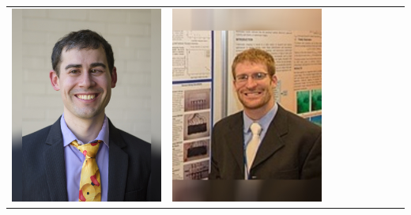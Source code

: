 \documentclass[landscape,a0paper,fontscale=0.292]{baposter}
\begin{document}
\begin{poster}
{\begin{center}
\begin{tabularx}{\linewidth}{X X X X X X X X X}
{\centering \includegraphics[width=0.65\linewidth]{alonso-mora.jpg}}&
{\centering \includegraphics[width=0.65\linewidth]{dusek.jpg}}&

\end{tabularx}
\end{center}}
\end{poster}
\end{document}
